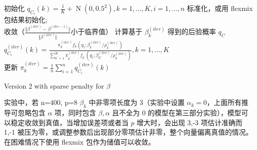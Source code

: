 \documentclass[12pt, a4paper, oneside]{article}
\numberwithin{equation}{section}
\begin{document}
\IncMargin{1em} %
\begin{algorithm}
	
	
	\BlankLine
	
	初始化 $q_{C_i}(k) = \frac{1}{K}+\operatorname{N}(0,0.5^2), k=1,...,K,i=1,...,n$ 标准化，或用 flexmix 包结果初始化; \\
	\Repeat
	{收敛（$ \frac{\Vert\beta^{(iter)}-\beta^{(iter-1)}\Vert}{\Vert\beta^{(iter)}\Vert} $小于临界值）}
	{
		计算基于 $\beta_k^{(iter)}$ 得到的后验概率 $q_C$\\
		\qquad $q^{(iter)}_{C_i}(k) = \frac{{\pi_k^{(iter)} f_k(y_i;\beta_{k}^{(iter)}/\rho_k^{(iter)})}}{\sum_{{k^\prime}=1}^{K}\pi^{(iter)}_{k^\prime} f_{k^\prime}(y_i;\beta_{k\prime}^{(iter)}/\rho_k^{(iter)})}, k = 1,...,K$ \\
		更新 $\pi^{(iter)}_k = \frac{1}{n}\sum_{i=1}^{n}q^{(iter)}_{C_i}(k)$ \\
	}
	\caption{Version 2 with sparse penalty for $\beta$}
	\label{alg:simplest-v2}
\end{algorithm}
\DecMargin{1em}

实验中，若 n=400, p=8 $\beta_k$ 中非零项长度为 3（实验中设置 $\alpha_k = 0$，上面所有推导可忽略包含 $\alpha$ 项，同时包含 $\beta, \alpha$ 且不全为 0 的模型在第三部分实验），模型可以稳定收敛到真值，当增加误差项或者当 $p$ 增大时，会出现 3,-3 项估计准确而 1,-1 被压为零，或调整参数后出现部分零项估计非零，整个向量偏离真值的情况。在困难情况下使用 flexmix 包作为储值可以收敛。
\end{document}
